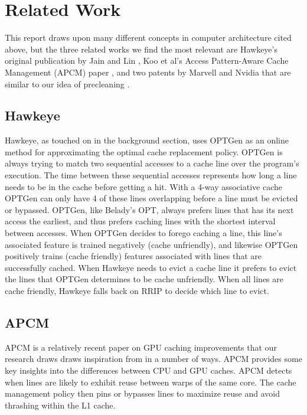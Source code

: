 \chapter{Related Work}

This report draws upon many different concepts in computer architecture cited above, but the three related works we find the most relevant are Hawkeye’s original publication by Jain and Lin \cite{hawkeye}, Koo et al’s Access Pattern-Aware Cache Management (APCM) paper \cite{apcm}, and two patents by Marvell and Nvidia that are similar to our idea of precleaning \cite{preclean_cpu,preclean_nvidia_patent}.

\section{Hawkeye}
Hawkeye, as touched on in the background section, uses OPTGen as an online method for approximating the optimal cache replacement policy. OPTGen is always trying to match two sequential accesses to a cache line over the program's execution. The time between these sequential accesses represents how long a line needs to be in the cache before getting a hit. With a 4-way associative cache OPTGen can only have 4 of these lines overlapping before a line must be evicted or bypassed. OPTGen, like Belady’s OPT, always prefers lines that has its next access the earliest, and thus prefers caching lines with the shortest interval between accesses. When OPTGen decides to forego caching a line, this line’s associated feature is trained negatively (cache unfriendly), and likewise OPTGen positively trains (cache friendly) features associated with lines that are successfully cached. When Hawkeye needs to evict a cache line it prefers to evict the lines that OPTGen determines to be cache unfriendly. When all lines are cache friendly, Hawkeye falls back on RRIP \cite{rrip} to decide which line to evict.

\section{APCM}
APCM is a relatively recent paper on GPU caching improvements that our research draws draws inspiration from in a number of ways. APCM provides some key insights into the differences between CPU and GPU caches. APCM detects when lines are likely to exhibit reuse between warps of the same core. The cache management policy then pins or bypasses lines to maximize reuse and avoid thrashing within the L1 cache.

